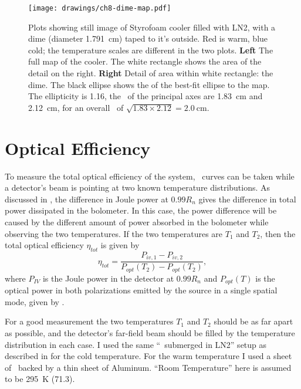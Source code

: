 \begin{figure}
\centering
\texttt{[image: drawings/ch8-dime-map.pdf]}
\caption{
  Plots showing still image of Styrofoam cooler filled with LN2, with a dime (diameter \SI{1.791}{\cm}) taped to it's outside.
  Red is warm, blue cold; the temperature scales are different in the two plots.
  \textbf{Left} The full map of the cooler. The white rectangle shows the area of the detail on the right.
  \textbf{Right} Detail of area within white rectangle: the dime.
  The black ellipse shows the \FWHM of the best-fit ellipse to the map. The ellipticity is \num{1.16}, the \FWHM\ of the principal axes are \SI{1.83}{\cm} and \SI{2.12}{\cm}, for an overall \FWHM\ of $\sqrt{1.83 \times 2.12} = \SI{2.0}{\cm}$.
}
\label{fig:ch8-dime-map}
\end{figure}

\section{Optical Efficiency} \label{sec:ch8-opt-eff}

To measure the total optical efficiency of the system, \IV\ curves can be taken while a detector's beam is pointing at two known temperature distributions.
As discussed in , the difference in Joule power at $0.99 R_n$ gives the difference in total power dissipated in the bolometer.
In this case, the power difference will be caused by the different amount of power absorbed in the bolometer while observing the two temperatures.
If the two temperatures are $T_1$ and $T_2$, then the total optical efficiency $\eta_{tot}$ is given by
\begin{equation}
  \eta_{tot} = \frac{P_{iv,1} - P_{iv,2}}{P_{opt}(T_2) - P_{opt}(T_2)},
\end{equation}
where $P_{IV}$ is the Joule power in the detector at $0.99 R_n$ and $P_{opt}(T)$ is the optical power in both polarizations emitted by the source in a single spatial mode, given by .

For a good measurement the two temperatures $T_1$ and $T_2$ should be as far apart as possible, and the detector's far-field beam should be filled by the temperature distribution in each case.
I used the same ``\ecco\ submerged in LN2'' setup as described in  for the cold temperature.
For the warm temperature I used a sheet of \ecco\ backed by a thin sheet of Aluminum.
``Room Temperature'' here is assumed to be \SI{295}{\kelvin} (\SI{71.3}{\fahrenheit}).

